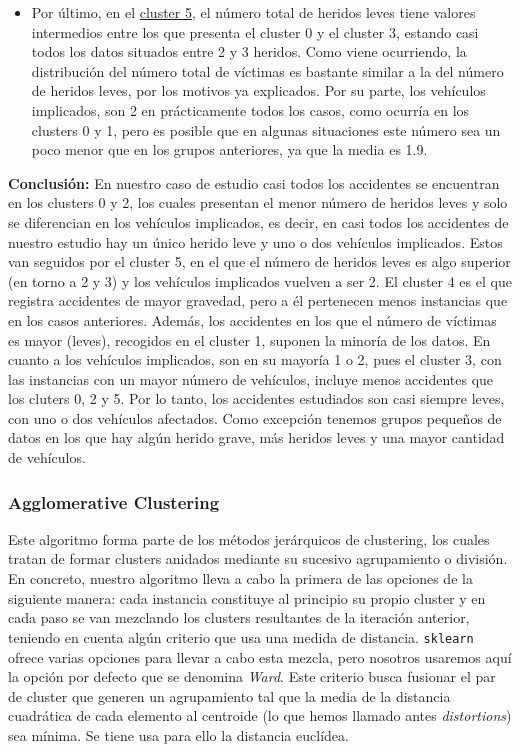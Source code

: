 \documentclass[a4paper,11pt]{book}
\begin{document}
\begin{itemize}
	\item Por último, en el \underline{cluster 5}, el número total de heridos leves tiene valores intermedios entre los que presenta el cluster 0 y el cluster 3, estando casi todos los datos situados entre 2 y 3 heridos. Como viene ocurriendo, la distribución del número total de víctimas es bastante similar a la del número de heridos leves, por los motivos ya explicados. Por su parte, los vehículos implicados, son 2 en prácticamente todos los casos, como ocurría en los clusters 0 y 1, pero es posible que en algunas situaciones este número sea un poco menor que en los grupos anteriores, ya que la media es 1.9.
	
\end{itemize}

\textbf{Conclusión:} En nuestro caso de estudio casi todos los accidentes se encuentran en los clusters 0 y 2, los cuales presentan el menor número de heridos leves y solo se diferencian en los vehículos implicados, es decir, en casi todos los accidentes de nuestro estudio hay un único herido leve y uno o dos vehículos implicados. Estos van seguidos por el cluster 5, en el que el número de heridos leves es algo superior (en torno a 2 y 3) y los vehículos implicados vuelven a ser 2. El cluster 4 es el que registra accidentes de mayor gravedad, pero a él pertenecen menos instancias que en los casos anteriores. Además, los accidentes en los que el número de víctimas es mayor (leves), recogidos en el cluster 1, suponen la minoría de los datos. En cuanto a los vehículos implicados, son en su mayoría 1 o 2, pues el cluster 3, con las instancias con un mayor número de vehículos, incluye menos accidentes que los cluters 0, 2 y 5.  Por lo tanto, los accidentes estudiados son casi siempre leves, con uno o dos vehículos afectados. Como excepción tenemos grupos pequeños de datos en los que hay algún herido grave, más heridos leves y una mayor cantidad de vehículos. 

\subsubsection{Agglomerative Clustering}

Este algoritmo forma parte de los métodos jerárquicos de clustering, los cuales tratan de formar clusters anidados mediante su sucesivo agrupamiento o división. En concreto, nuestro algoritmo lleva a cabo la primera de las opciones de la siguiente manera: cada instancia constituye al principio su propio cluster y en cada paso se van mezclando los clusters resultantes de la iteración anterior, teniendo en cuenta algún criterio que usa una medida de distancia. \texttt{sklearn} ofrece varias opciones para llevar a cabo esta mezcla, pero nosotros usaremos aquí la opción por defecto que se denomina \textit{Ward}. Este criterio busca fusionar el par de cluster que generen un agrupamiento tal que la media de la distancia cuadrática de cada elemento al centroide (lo que hemos llamado antes \textit{distortions}) sea mínima. Se tiene usa para ello la distancia euclídea. 
\end{document}
